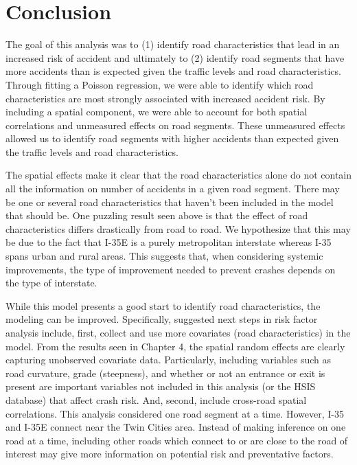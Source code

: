 \chapter{Conclusion}

The goal of this analysis was to (1) identify road characteristics that lead in an increased risk of accident and ultimately to (2) identify road segments that have more accidents than is expected given the traffic levels and road characteristics. Through fitting a Poisson regression, we were able to identify which road characteristics are most strongly associated with increased accident risk. By including a spatial component, we were able to account for both spatial correlations and unmeasured effects on road segments. These unmeasured effects allowed us to identify road segments with higher accidents than expected given the traffic levels and road characteristics. 

The spatial effects make it clear that the road characteristics alone do not contain all the information on number of accidents in a given road segment. There may be one or several road characteristics that haven't been included in the model that should be. One puzzling result seen above is that the effect of road characteristics differs drastically from road to road.  We hypothesize that this may be due to the fact that I-35E is a purely metropolitan interstate whereas I-35 spans urban and rural areas.  This suggests that, when considering systemic improvements, the type of improvement needed to prevent crashes depends on the type of interstate.

While this model presents a good start to identify road characteristics, the modeling can be improved.  Specifically, suggested next steps in risk factor analysis include, first, collect and use more covariates (road characteristics) in the model. From the results seen in Chapter 4, the spatial random effects are clearly capturing unobserved covariate data.  Particularly, including variables such as road curvature, grade (steepness), and whether or not an entrance or exit is present are important variables not included in this analysis (or the HSIS database) that affect crash risk. And, second, include cross-road spatial correlations. This analysis considered one road segment at a time.  However, I-35 and I-35E connect near the Twin Cities area.  Instead of making inference on one road at a time, including other roads which connect to or are close to the  road of interest may give more information on potential risk and preventative factors.
